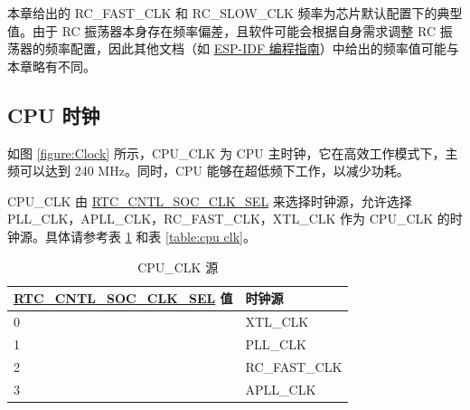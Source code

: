 \documentclass[main\_\_CN.tex]{subfiles}
\begin{document}
\begin{tiplisting}
本章给出的 RC\_FAST\_CLK 和 RC\_SLOW\_CLK 频率为芯片默认配置下的典型值。由于 RC 振荡器本身存在频率偏差，且软件可能会根据自身需求调整 RC 振荡器的频率配置，因此其他文档（如 \href{https://docs.espressif.com/projects/esp-idf/zh_CN/latest/esp32/api-reference/peripherals/clk_tree.html}{ESP-IDF 编程指南}）中给出的频率值可能与本章略有不同。
\end{tiplisting}

\subsection{CPU 时钟}

如图 \ref{figure:Clock} 所示，CPU\_CLK 为 CPU 主时钟，它在高效工作模式下，主频可以达到 240 MHz。同时，CPU 能够在超低频下工作，以减少功耗。

CPU\_CLK 由 \hyperref[regdesc:RTCCNTLSOCCLKSEL]{RTC\_CNTL\_SOC\_CLK\_SEL} 来选择时钟源，允许选择 PLL\_CLK，APLL\_CLK，RC\_FAST\_CLK，XTL\_CLK 作为 CPU\_CLK 的时钟源。具体请参考表 \ref{table:cpu clksrc} 和表 \ref{table:cpu clk}。
\begin{longtable}[c]{|l|l| }
       \caption{CPU\_CLK 源}
		\label{table:cpu clksrc}
	    \\\hline
        \rowcolor{lightgray}
       \hyperref[regdesc:RTCCNTLSOCCLKSEL]{RTC\_CNTL\_SOC\_CLK\_SEL} 值 & 时钟源 \\
        \hline
        0 & XTL\_CLK \\
        \hline
        1 & PLL\_CLK \\
        \hline
        2 & RC\_FAST\_CLK \\
        \hline
        3 & APLL\_CLK \\
        \hline
\end{longtable}
\end{document}
